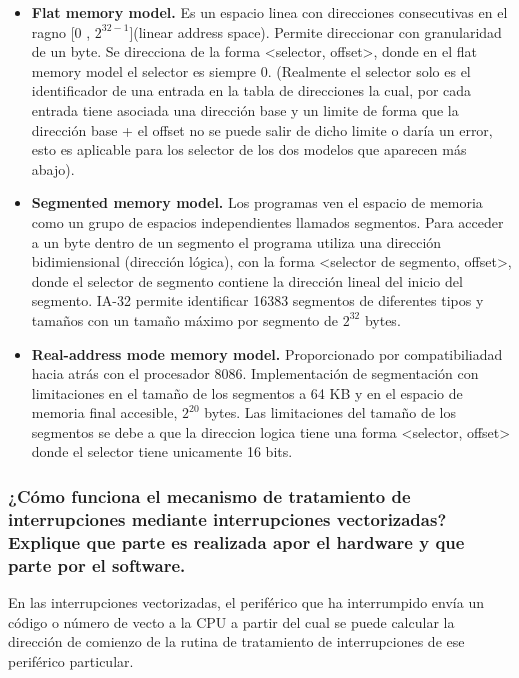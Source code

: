 \documentclass{article}
\begin{document}
				\begin{itemize}
					\item \textbf{Flat memory model.} Es un espacio linea con direcciones consecutivas en el ragno [0 , $2^{32-1}$](linear address space). Permite direccionar con granularidad de un byte. Se direcciona de la forma <selector, offset>, donde en el flat memory model el selector es siempre 0. (Realmente el selector solo es el identificador de una entrada en la tabla de direcciones la cual, por cada entrada tiene asociada una dirección base y un limite de forma que la dirección base + el offset no se puede salir de dicho limite o daría un error, esto es aplicable para los selector de los dos modelos que aparecen más abajo).
					
					\item \textbf{Segmented memory model.} Los programas ven el espacio de memoria como un grupo de espacios independientes llamados segmentos. Para acceder a un byte dentro de un segmento el programa utiliza una dirección bidimiensional (dirección lógica), con la forma <selector de segmento, offset>, donde el selector de segmento contiene la dirección lineal del inicio del segmento.
					IA-32 permite identificar 16383 segmentos de diferentes tipos y tamaños con un tamaño máximo por segmento de $2^{32}$ bytes.
					
					\item \textbf{Real-address mode memory model.} Proporcionado por compatibiliadad hacia atrás con el procesador 8086. Implementación de segmentación con limitaciones en el tamaño de los segmentos a 64 KB y en el espacio de memoria final accesible, $2^{20}$ bytes.
					Las limitaciones del tamaño de los segmentos se debe a que la direccion logica tiene una forma <selector, offset> donde el selector tiene unicamente 16 bits.
					
				\end{itemize}
				
			\subsubsection*{¿Cómo funciona el mecanismo de tratamiento de interrupciones mediante interrupciones vectorizadas? Explique que parte es realizada apor el hardware y que parte por el software.}
				En las interrupciones vectorizadas, el periférico que ha interrumpido envía un código o número de vecto a la CPU a partir del cual se puede calcular la dirección de comienzo de la rutina de tratamiento de interrupciones de ese periférico particular.
				
\end{document}
